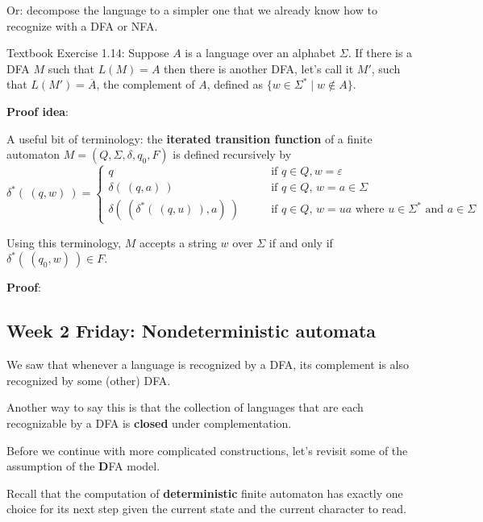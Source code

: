 \documentclass[12pt, oneside]{article}
\begin{document}
\vfill
\newpage
Or: decompose the language to a simpler one 
that we already know how to recognize with a DFA or NFA.


Textbook Exercise 1.14: 
Suppose $A$ is a language over an alphabet $\Sigma$. 
If there is a DFA $M$ such that $L(M) = A$ then there is another DFA, let's call it $M'$, such that 
$L(M') = \overline{A}$, the complement of $A$, defined as $\{ w \in \Sigma^* \mid w \notin A \}$.


{\bf Proof idea}:


\vfill
A useful bit of terminology: the {\bf iterated transition function} of a finite automaton
$M = (Q, \Sigma, \delta, q_0, F)$ is defined recursively by
\[
\delta^* (~(q,w)~) 
=\begin{cases}
q  \qquad &\text{if $q \in Q, w = \varepsilon$} \\
\delta( ~(q,a)~) \qquad &\text{if $q \in Q$, $w = a \in \Sigma$ } \\
\delta(~(\delta^*(~(q,u)~), a) ~) \qquad &\text{if $q \in Q$, $w = ua$ where $u \in  \Sigma^*$ and $a \in \Sigma$}
\end{cases}
\]

Using  this terminology, $M$ accepts a string $w$ over $\Sigma$ if and only if $\delta^*( ~(q_0,w)~) \in F$.


{\bf Proof}: 
\vfill

 
\newpage
\subsection*{Week 2 Friday: Nondeterministic automata}

We saw that whenever a language is recognized by a DFA, its
complement is also recognized by some (other) DFA. 

Another way to say this is that the collection of languages
that are each recognizable by a DFA is {\bf closed} under complementation.


Before we continue with more complicated constructions, let's revisit some of 
the assumption of the {\bf D}FA model.

Recall that the computation of {\bf deterministic} finite automaton has exactly one choice for its next step given the current state and the current character to read.
\end{document}

